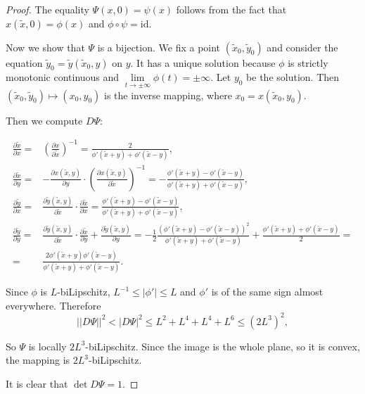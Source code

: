 \documentclass[10pt,a4paper]{amsart}
\begin{document}
\begin{proof}
The equality $\Psi(x, 0) = \psi(x)$ follows from the fact that $x(\widetilde x, 0) = \phi(x)$ and $\phi\circ\psi = \mathrm{id}.$

Now we show that $\Psi$ is a bijection. We fix a point $(\widetilde x_0, \widetilde y_0)$ and consider the equation $\widetilde y_0 = \widetilde y(\widetilde x_0, y)$ on $y.$ It has a unique solution because $\phi$ is strictly monotonic continuous and $\lim\limits_{t\to\pm\infty} \phi(t)= \pm\infty$. Let $y_0$ be the solution. Then $(\widetilde x_0, \widetilde y_0)\mapsto (x_0, y_0)$ is the inverse mapping, where $x_0 = x(\widetilde x_0, y_0).$

Then we compute $D\Psi$:

$$
\begin{aligned}
\frac{\partial \widetilde x}{\partial x} =& \left(\frac{\partial x}{\partial \widetilde x}\right)^{-1} = \frac2{\phi'(\widetilde x + y) + \phi'(\widetilde x - y)},
\\
\frac{\partial \widetilde x}{\partial y} =& -\frac{\partial x (\widetilde x, y)}{\partial y}\cdot\left(\frac{\partial x (\widetilde x, y)}{\partial \widetilde x} \right)^{-1} = - \frac{\phi'(\widetilde x + y) - \phi'(\widetilde x - y)}{\phi'(\widetilde x + y) + \phi'(\widetilde x - y)},\\
\frac{\partial \widetilde y}{\partial x} =& \frac{\partial \widetilde y(\widetilde x, y)}{\partial \widetilde x}\cdot \frac{\partial \widetilde x}{\partial x} = \frac{\phi'(\widetilde x + y) - \phi'(\widetilde x - y)}{\phi'(\widetilde x + y) + \phi'(\widetilde x - y)},\\
\frac{\partial \widetilde y}{\partial y} =& \frac{\partial \widetilde y(\widetilde x, y)}{\partial \widetilde x}\cdot \frac{\partial \widetilde x}{\partial y} + \frac{\partial \widetilde y(\widetilde x, y)}{\partial y}=
-\frac12 \frac{\left(\phi'(\widetilde x + y) - \phi'(\widetilde x - y)\right)^2}{\phi'(\widetilde x + y) + \phi'(\widetilde x - y)} + \frac{\phi'(\widetilde x + y) + \phi'(\widetilde x - y)}2 = \\
=& \frac{2\phi'(\widetilde x + y)\phi'(\widetilde x - y)}{\phi'(\widetilde x + y) + \phi'(\widetilde x - y)}.
\end{aligned}
$$

Since $\phi$ is $L$-biLipschitz, $L^{-1} \le |\phi'|\le L$ and $\phi'$ is of the same sign almost everywhere. Therefore
$$
||D\Psi||^2 < |D\Psi|^2 \le L^2 + L^4 + L^4 + L^6 \le \left(2L^3\right)^2,
$$

So $\Psi$ is locally $2 L^3$-biLipschitz. Since the image is the whole plane, so it is convex, the mapping is $2L^3$-biLipschitz.

It is clear that $\det D\Psi = 1.$
\end{proof}
\end{document}
